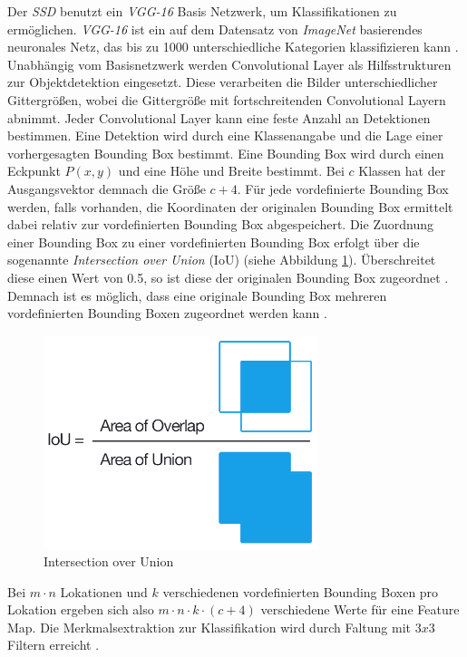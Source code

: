 Der \textit{SSD} benutzt ein \textit{VGG-16} Basis Netzwerk, um Klassifikationen zu ermöglichen. \textit{VGG-16} ist ein auf dem Datensatz von \textit{ImageNet} basierendes neuronales Netz, das bis zu 1000 unterschiedliche Kategorien klassifizieren kann \cite{MathWorks.2019b}. Unabhängig vom Basisnetzwerk werden Convolutional Layer als Hilfsstrukturen zur Objektdetektion eingesetzt. Diese verarbeiten die Bilder unterschiedlicher Gittergrößen, wobei die Gittergröße mit fortschreitenden Convolutional Layern abnimmt. Jeder Convolutional Layer kann eine feste Anzahl an Detektionen bestimmen. Eine Detektion wird durch eine Klassenangabe und die Lage einer vorhergesagten Bounding Box bestimmt. Eine Bounding Box wird durch einen Eckpunkt $P(x,y)$ und eine Höhe und Breite bestimmt. Bei $c$ Klassen hat der Ausgangsvektor demnach die Größe $c+4$. Für jede vordefinierte Bounding Box werden, falls vorhanden, die Koordinaten der originalen Bounding Box ermittelt dabei relativ zur vordefinierten Bounding Box abgespeichert. Die Zuordnung einer Bounding Box zu einer vordefinierten Bounding Box erfolgt über die sogenannte \textit{Intersection over Union} (IoU) (siehe Abbildung \ref{iou}). Überschreitet diese einen Wert von 0.5, so ist diese der originalen Bounding Box zugeordnet \cite{ssd.20161229}. Demnach ist es möglich, dass eine originale Bounding Box mehreren vordefinierten Bounding Boxen zugeordnet werden kann \cite{ssd.20161229} .

\begin{figure}[ht]
	\begin{center}
		\includegraphics[width=8cm]{Bilder/iou_equation.png} 
		\caption[Intersection over Union]{Intersection over Union \cite{AdrianRosebrock.20161107}}
		\label{iou}
	\end{center}
\end{figure}

Bei $m \cdot n$ Lokationen und $k$ verschiedenen vordefinierten Bounding Boxen pro Lokation ergeben sich also $m \cdot n \cdot k \cdot (c+4)$ verschiedene Werte für eine Feature Map. Die Merkmalsextraktion zur Klassifikation wird durch Faltung mit $3x3$ Filtern erreicht \cite{ssd.20161229}.

